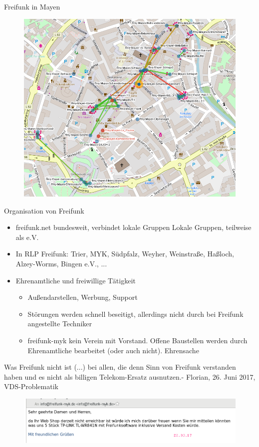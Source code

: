 \documentclass{beamer}
\begin{document}
\begin{frame}{Freifunk in Mayen}

\begin{figure}
	\centering
	\includegraphics[width=0.7\linewidth]{Bilder/Mayen}
	\label{fig:mayen}
\end{figure}

\end{frame}

\begin{frame} {Organisation von Freifunk}
\begin{itemize}
\item freifunk.net bundesweit, verbindet lokale Gruppen
Lokale Gruppen, teilweise als e.V.
\item In RLP Freifunk: Trier, MYK, Südpfalz, Weyher, Weinstraße, Haßloch, Alzey-Worms, Bingen e.V., ...
\item Ehrenamtliche und freiwillige Tätigkeit
\begin{itemize}
\item Außendarstellen, Werbung, Support
\item Störungen werden schnell beseitigt, allerdings nicht durch bei Freifunk angestellte Techniker
\item freifunk-myk kein Verein mit Vorstand. Offene Baustellen werden durch Ehrenamtliche bearbeitet (oder auch nicht). Ehrensache
\end{itemize}
\end{itemize}
\end{frame}

\begin{frame}{Was Freifunk nicht ist}
\glqq (...) bei allen, die denn Sinn von Freifunk verstanden haben und es nicht als billigen Telekom-Ersatz ausnutzen.\grqq - Florian, 26. Juni 2017, VDS-Problematik
\begin{figure}
\centering
\includegraphics[width=1.0\linewidth]{Bilder/Webshopmail}
\label{fig:webshopmail}
\end{figure}
\end{frame}
\end{document}

